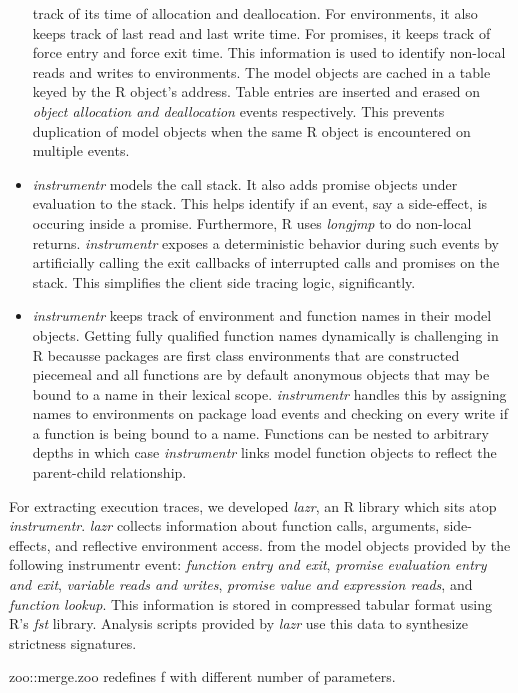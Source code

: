 \documentclass[screen,acmsmall]{acmart}
\begin{document}
\begin{itemize}
track of its time of allocation and deallocation. For environments, it also
keeps track of last read and last write time. For promises, it keeps track of
force entry and force exit time. This information is used to identify non-local
reads and writes to environments. The model objects are cached in a table keyed
by the R object's address. Table entries are inserted and erased on \emph{object
  allocation and deallocation} events respectively. This prevents duplication of
model objects when the same R object is encountered on multiple events.
\item \emph{instrumentr} models the call stack. It also adds promise objects under
evaluation to the stack. This helps identify if an event, say a side-effect, is
occuring inside a promise. Furthermore, R uses \emph{longjmp} to do non-local
returns. \emph{instrumentr} exposes a deterministic behavior during such events
by artificially calling the exit callbacks of interrupted calls and promises on
the stack. This simplifies the client side tracing logic, significantly.
\item \emph{instrumentr} keeps track of environment and function names in their model
objects. Getting fully qualified function names dynamically is challenging in R
becausse packages are first class environments that are constructed piecemeal
and all functions are by default anonymous objects that may be bound to a name
in their lexical scope. \emph{instrumentr} handles this by assigning names to
environments on package load events and checking on every write if a function is
being bound to a name. Functions can be nested to arbitrary depths in which case
\emph{instrumentr} links model function objects to reflect the parent-child
relationship.
\end{itemize}

For extracting execution
traces, we developed \emph{lazr}, an R library which sits atop
\emph{instrumentr}. \emph{lazr} collects information about function calls,
arguments, side-effects, and reflective environment access. from the model
objects provided by the following instrumentr event: \emph{function entry and
  exit}, \emph{promise evaluation entry and exit}, \emph{variable reads and
  writes}, \emph{promise value and expression reads}, and \emph{function
  lookup}. This information is stored in compressed tabular format using R's
\emph{fst} library. Analysis scripts provided by \emph{lazr} use this data to
synthesize strictness signatures.

zoo::merge.zoo redefines f with different number of parameters.
\end{document}
